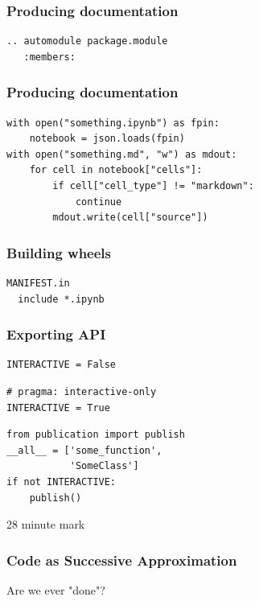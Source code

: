 \begin{frame}[fragile]
\frametitle{Producing documentation}

\begin{lstlisting}
.. automodule package.module
   :members:
\end{lstlisting}

\end{frame}

\begin{frame}[fragile]
\frametitle{Producing documentation}

\begin{lstlisting}
with open("something.ipynb") as fpin:
    notebook = json.loads(fpin)
with open("something.md", "w") as mdout:
    for cell in notebook["cells"]:
        if cell["cell_type"] != "markdown":
            continue
        mdout.write(cell["source"])
\end{lstlisting}

\end{frame}


\begin{frame}[fragile]
\frametitle{Building wheels}

\begin{lstlisting}
MANIFEST.in
  include *.ipynb
\end{lstlisting}

\end{frame}

\begin{frame}[fragile]
\frametitle{Exporting API}

\begin{lstlisting}[frame=single]
INTERACTIVE = False
\end{lstlisting}

\begin{lstlisting}[frame=single]
# pragma: interactive-only 
INTERACTIVE = True
\end{lstlisting}

\begin{lstlisting}[frame=single]
from publication import publish
__all__ = ['some_function',
           'SomeClass']
if not INTERACTIVE:
    publish()
\end{lstlisting}

\end{frame}

28 minute mark

\begin{frame}
\frametitle{Code as Successive Approximation}

Are we ever "done"?

\end{frame}

